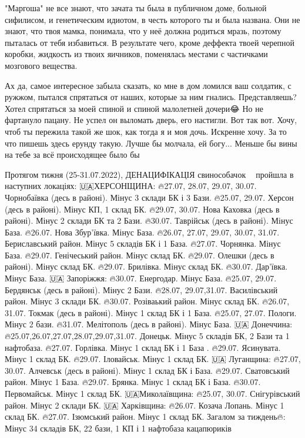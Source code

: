 "Маргоша" не все знают, что зачата ты была в публичном доме, больной сифилисом,
и генетическим идиотом, в честь которого ты и была названа. Они не знают, что
твоя мамка, понимала, что у неё должна родиться мразь, поэтому пыталась от тебя
избавиться. В результате чего, кроме деффекта твоей черепной коробки, жидкость
из твоих яичников, поменялась местами с частичками мозгового вещества.

Ах да, самое интересное забыла сказать, ко мне в дом ломился ваш солдатик, с
ружжом, пытался спрятаться от наших, которые за ним гнались. Представляешь?
Хотел спрятаться за моей спиной и спиной малолетней дочери😂 Но не фартануло
пацану. Не успел он выломать дверь, его настигли. Вот так вот. Хочу, чтоб ты
пережила такой же шок, как тогда я и моя дочь. Искренне хочу. За то что пишешь
здесь ерунду такую. Лучше бы молчала, ей богу... Меньше бы вины на тебе за всё
происходящее было бы

Протягом тижня (25-31.07.2022), ДЕНАЦИФІКАЦІЯ свинособачок 🐷🐶 пройшла в наступних локаціях:
🇺🇦ХЕРСОНЩИНА:
🔥27.07, 28.07, 29.07, 30.07. Чорнобаївка (десь в районі). Мінус 3 склади БК і 3 Бази.
🔥25.07, 29.07. Херсон (десь в районі). Мінус КП, 1 склад БК.
🔥29.07, 30.07. Нова Каховка (десь в районі). Мінус 2 склади БК та 2 Бази.
🔥30.07. Таврійськ (десь в районі). Мінус База.
🔥26.07. Нова Збур'ївка. Мінус База.
🔥26.07, 27.07, 29.07, 30.07, 31.07. Бериславський район. Мінус 5 складів БК і 1 База.
🔥27.07. Чорнянка. Мінус База.
🔥29.07. Генічеський район. Мінус склад БК.
🔥29.07. Олешки (десь в районі). Мінус склад БК.
🔥29.07. Брилівка. Мінус склад БК.
🔥30.07. Дар'ївка. Мінус База.
🇺🇦 Запоріжжя:
🔥30.07. Енергодар. Мінус База.
🔥25.07, 29.07. Бердянськ (десь в районі). Мінус 2 Бази.
🔥28.07, 29.07,31.07. Василівський район. Мінус 3 склади БК.
🔥30.07. Розіваький район. Мінус склад БК.
🔥26.07, 31.07. Токмак (десь в районі). Мінус 1 склад БК і 1 База.
🔥25.07, 27.07. Пологи. Мінус 2 бази.
🔥31.07. Мелітополь (десь в районі). Мінус База.
🇺🇦 Донеччина:
🔥25.07,26.07,27.07,28.07,29.07,31.07. Донецьк. Мінус 5 складів БК, 2 Бази та 1 нафтобаза.
🔥27.07. Горлівка. Мінус 1 склад БК і 1 База .
🔥29.07. Ясинувата. Мінус 1 склад БК.
🔥29.07. Іловайськ. Мінус 1 склад БК.
🇺🇦 Луганщина:
🔥27.07, 30.07. Алчевськ (десь в районі). Мінус 1 склад БК і База.
🔥29.07. Сватовський район. Мінус 1 База.
🔥29.07. Брянка. Мінус 1 склад БК і База.
🔥30.07. Первомайськ. Мінус 1 склад БК.
🇺🇦Миколаївщина:
🔥25.07, 30.07. Снігурівський район. Мінус 2 склади БК.
🇺🇦 Харківщина:
🔥26.07. Козача Лопань. Мінус 1 склад БК.
🔥27.07. Ізюмський район. Мінус 1 склад БК.
Загалом за тиждень🔥: Мінус 34 складів БК, 22 бази, 1 КП і 1 нафтобаза кацапюриків 🐷🚀

